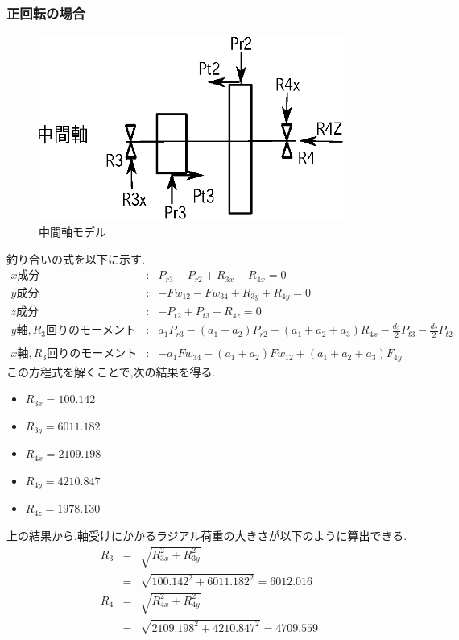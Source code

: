 \subsubsection{正回転の場合}
\begin{figure}[htbp]
\begin{center}
\includegraphics[width=10cm]{../picture/jiku4.eps}
\end{center}
\caption{中間軸モデル}
\end{figure}
釣り合いの式を以下に示す.
\begin{eqnarray}
x成分&:&P_{r3}-P_{r2}+R_{3x}-R_{4x}=0\\
y成分&:&-Fw_{12}-Fw_{34}+R_{3y}+R_{4y}=0\\
z成分&:&-P_{t2}+P_{t3}+R_{4z}=0\\
y軸,R_3回りのモーメント&:&a_1P_{r3}-(a_1+a_2)P_{r2}-(a_1+a_2+a_3)R_{4x}-\frac{d_3}{2}P_{t3}-\frac{d_2}{2}P_{t2}\nonumber\\
\\
x軸,R_3回りのモーメント&:&-a_1Fw_{34}-(a_1+a_2)Fw_{12}+(a_1+a_2+a_3)F_{4y}
\end{eqnarray}
この方程式を解くことで,次の結果を得る.
\begin{itemize}
\item $R_{3x} = 100.142$
\item $R_{3y} = 6011.182$
\item $R_{4x} = 2109.198$
\item $R_{4y} = 4210.847$
\item $R_{4z} = 1978.130$
\end{itemize}
上の結果から,軸受けにかかるラジアル荷重の大きさが以下のように算出できる.
\begin{eqnarray}
R_3 &=& \sqrt {R_{3x}^2+R_{3y}^2}\\
    &=& \sqrt {100.142^2+6011.182^2}=6012.016\\
R_4 &=& \sqrt {R_{4x}^2+R_{4y}^2}\\
    &=& \sqrt {2109.198^2+4210.847^2}=4709.559
\end{eqnarray}
